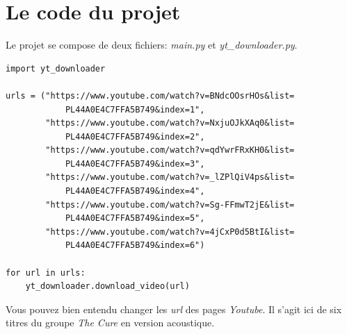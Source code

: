 \documentclass[a4paper,11pt]{book}
\begin{document}
\section{Le code du projet}
Le projet se compose de deux fichiers: \textit{main.py} et \textit{yt\_downloader.py}.

\begin{lstlisting}[caption=Le fichier \textit{main.py}]
import yt_downloader

urls = ("https://www.youtube.com/watch?v=BNdcOOsrHOs&list=
            PL44A0E4C7FFA5B749&index=1",
        "https://www.youtube.com/watch?v=NxjuOJkXAq0&list=
            PL44A0E4C7FFA5B749&index=2",
        "https://www.youtube.com/watch?v=qdYwrFRxKH0&list=
            PL44A0E4C7FFA5B749&index=3",
        "https://www.youtube.com/watch?v=_lZPlQiV4ps&list=
            PL44A0E4C7FFA5B749&index=4",
        "https://www.youtube.com/watch?v=Sg-FFmwT2jE&list=
            PL44A0E4C7FFA5B749&index=5",
        "https://www.youtube.com/watch?v=4jCxP0d5BtI&list=
            PL44A0E4C7FFA5B749&index=6")

for url in urls:
    yt_downloader.download_video(url)
\end{lstlisting}
\medskip

Vous pouvez bien entendu changer les \textit{url} des pages \textit{Youtube}. Il s'agit ici de six titres du groupe \textit{The Cure} en version acoustique.
\medskip
\end{document}
